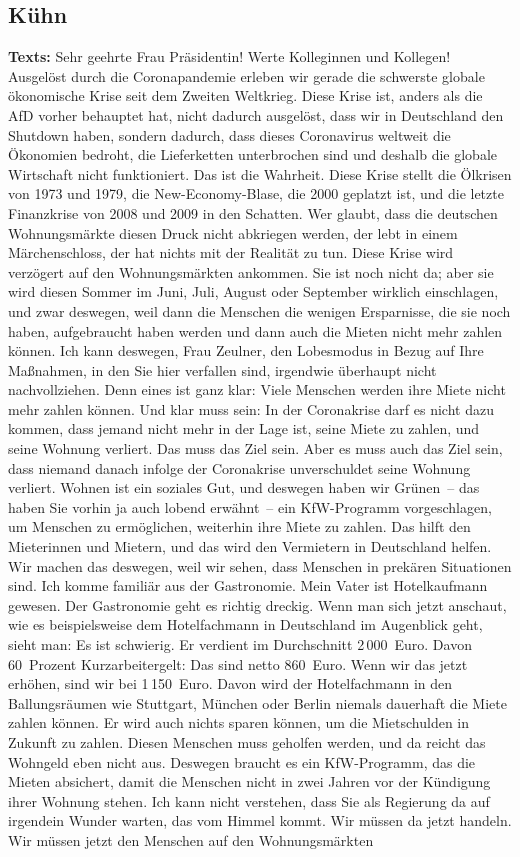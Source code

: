 \documentclass{article}
\begin{document}
\subsection{Kühn}
\noindent\textbf{Texts:} Sehr geehrte Frau Präsidentin! Werte Kolleginnen und Kollegen! Ausgelöst durch die Coronapandemie erleben wir gerade die schwerste globale ökonomische Krise seit dem Zweiten Weltkrieg. Diese Krise ist, anders als die AfD vorher behauptet hat, nicht dadurch ausgelöst, dass wir in Deutschland den Shutdown haben, sondern dadurch, dass dieses Coronavirus weltweit die Ökonomien bedroht, die Lieferketten unterbrochen sind und deshalb die globale Wirtschaft nicht funktioniert. Das ist die Wahrheit. Diese Krise stellt die Ölkrisen von 1973 und 1979, die New-Economy-Blase, die 2000 geplatzt ist, und die letzte Finanzkrise von 2008 und 2009 in den Schatten. Wer glaubt, dass die deutschen Wohnungsmärkte diesen Druck nicht abkriegen werden, der lebt in einem Märchenschloss, der hat nichts mit der Realität zu tun. Diese Krise wird verzögert auf den Wohnungsmärkten ankommen. Sie ist noch nicht da; aber sie wird diesen Sommer im Juni, Juli, August oder September wirklich einschlagen, und zwar deswegen, weil dann die Menschen die wenigen Ersparnisse, die sie noch haben, aufgebraucht haben werden und dann auch die Mieten nicht mehr zahlen können. Ich kann deswegen, Frau Zeulner, den Lobesmodus in Bezug auf Ihre Maßnahmen, in den Sie hier verfallen sind, irgendwie überhaupt nicht nachvollziehen. Denn eines ist ganz klar: Viele Menschen werden ihre Miete nicht mehr zahlen können. Und klar muss sein: In der Coronakrise darf es nicht dazu kommen, dass jemand nicht mehr in der Lage ist, seine Miete zu zahlen, und seine Wohnung verliert. Das muss das Ziel sein.  Aber es muss auch das Ziel sein, dass niemand danach infolge der Coronakrise unverschuldet seine Wohnung verliert. Wohnen ist ein soziales Gut, und deswegen haben wir Grünen – das haben Sie vorhin ja auch lobend erwähnt – ein KfW-Programm vorgeschlagen, um Menschen zu ermöglichen, weiterhin ihre Miete zu zahlen. Das hilft den Mieterinnen und Mietern, und das wird den Vermietern in Deutschland helfen. Wir machen das deswegen, weil wir sehen, dass Menschen in prekären Situationen sind. Ich komme familiär aus der Gastronomie. Mein Vater ist Hotelkaufmann gewesen. Der Gastronomie geht es richtig dreckig. Wenn man sich jetzt anschaut, wie es beispielsweise dem Hotelfachmann in Deutschland im Augenblick geht, sieht man: Es ist schwierig. Er verdient im Durchschnitt 2 000 Euro. Davon 60 Prozent Kurzarbeitergelt: Das sind netto 860 Euro.  Wenn wir das jetzt erhöhen, sind wir bei 1 150 Euro. Davon wird der Hotelfachmann in den Ballungsräumen wie Stuttgart, München oder Berlin niemals dauerhaft die Miete zahlen können. Er wird auch nichts sparen können, um die Mietschulden in Zukunft zu zahlen. Diesen Menschen muss geholfen werden, und da reicht das Wohngeld eben nicht aus. Deswegen braucht es ein KfW-Programm, das die Mieten absichert, damit die Menschen nicht in zwei Jahren vor der Kündigung ihrer Wohnung stehen.  Ich kann nicht verstehen, dass Sie als Regierung da auf irgendein Wunder warten, das vom Himmel kommt.  Wir müssen da jetzt handeln. Wir müssen jetzt den Menschen auf den Wohnungsmärkten 
\end{document}
